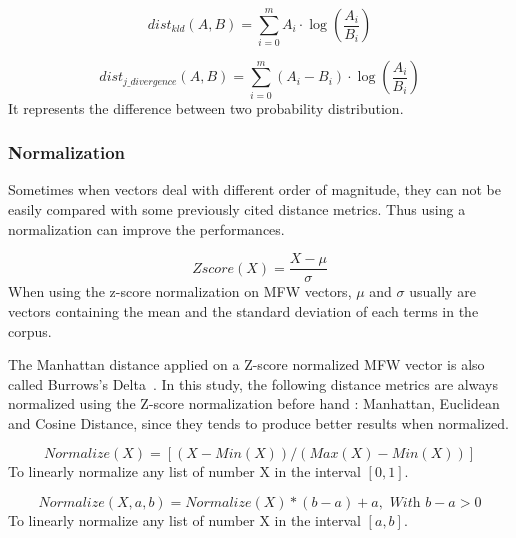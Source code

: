 \begin{definition}
  \begin{equation}
    dist_{kld}(A, B) = \sum_{i=0}^{m} A_i \cdot \log(\frac{A_i}{B_i})
  \end{equation}
\end{definition}

\begin{definition}
  \begin{equation}
    dist_{j\_divergence}(A, B) = \sum_{i=0}^{m} (A_i - B_i) \cdot \log(\frac{A_i}{B_i})
  \end{equation}
  It represents the difference between two probability distribution.
\end{definition}


\subsubsection{Normalization}

Sometimes when vectors deal with different order of magnitude, they can not be easily compared with some previously cited distance metrics.
Thus using a normalization can improve the performances.

\begin{definition}
  \label{def:z_score}
  \begin{equation}
    Zscore(X) = \frac{X - \mu}{\sigma}
  \end{equation}
  When using the z-score normalization on MFW vectors, $\mu$ and $\sigma$ usually are vectors containing the mean and the standard deviation of each terms in the corpus.
\end{definition}

The Manhattan distance applied on a Z-score normalized MFW vector is also called Burrows's Delta~\cite{savoy_stylo}.
In this study, the following distance metrics are always normalized using the Z-score normalization before hand : Manhattan, Euclidean and Cosine Distance, since they tends to produce better results when normalized.

\begin{definition}[Normalization]
  \label{def:normalization}
  \begin{equation}
    Normalize(X) = \left[\left(X - Min(X)\right) / \left(Max(X) - Min(X)\right)\right]
  \end{equation}
  To linearly normalize any list of number X in the interval $[0, 1]$.

  \begin{equation}
    Normalize(X, a, b) = Normalize(X) * (b - a) + a, \textit{ With }b - a > 0
  \end{equation}
  To linearly normalize any list of number X in the interval $[a, b]$.
\end{definition}

